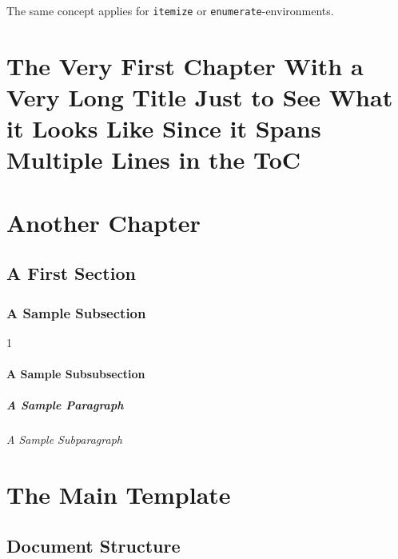 The same concept applies for \lstinline!itemize! or \lstinline!enumerate!-environments.
















\chapter[The Short Title of the Chapter Showing Up in the TOC and the Page Headers]{The Very First Chapter With a Very Long Title Just to See What it Looks Like Since it Spans Multiple Lines in the ToC}


\lipsum[1-13]

\chapter{Another Chapter}

\lipsum[14-27]

\section{A First Section}

\lipsum[1-3]

\subsection{A Sample Subsection}

1\lipsum[1-3]

\subsubsection{A Sample Subsubsection}

\lipsum[1-3]

\paragraph{A Sample Paragraph}
\lipsum[1-3]

\subparagraph{A Sample Subparagraph}
\lipsum[1-3]


\chapter{The Main Template}

\section{Document Structure}

